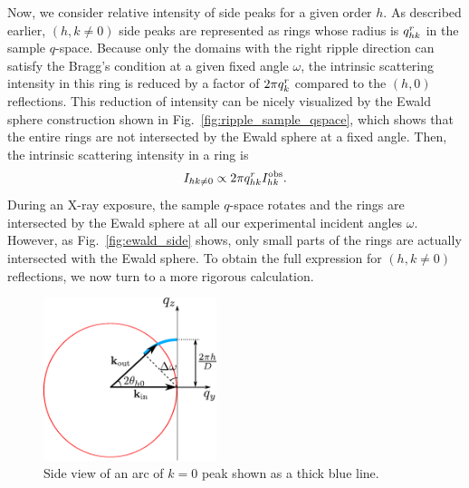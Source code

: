 Now, we consider relative intensity of side peaks for a given order $h$.
As described earlier, $(h,k\neq 0)$ side peaks are represented as
rings whose radius is $q_{hk}^r$ in the sample $q$-space. 
Because only the domains with the right ripple direction can satisfy the Bragg's condition at a given fixed
angle $\omega$, the intrinsic scattering intensity in this ring is reduced by 
a factor of $2\pi q_{k}^r$ compared to the $(h,0)$ reflections.
This reduction of intensity can be nicely visualized by the Ewald sphere construction
shown in Fig.~\ref{fig:ripple_sample_qspace},
which shows that the entire rings are not intersected by the Ewald sphere at 
a fixed angle. Then, the intrinsic scattering intensity in a ring is
\begin{equation}
  I_{hk\neq 0} \propto 2\pi q_{hk}^r I_{hk}^\textrm{obs}. \label{eq:side_ewald}
\end{equation}
During an X-ray exposure, the sample $q$-space rotates and 
the rings are intersected by the Ewald sphere at all our experimental incident angles $\omega$.
However, as Fig.~\ref{fig:ewald_side} shows, only small parts of the rings
are actually intersected with the Ewald sphere.  
To obtain the full expression for $(h,k\neq 0)$ reflections, we now turn
to a more rigorous calculation.

\begin{figure}[htbp]
  \centering
  \includegraphics[width=0.45\textwidth]{figures/ripple/analysis/ewald_main}
  \caption{Side view of an arc of $k=0$ peak shown as a thick blue line.}
  \label{fig:ewald_main}
\end{figure}

